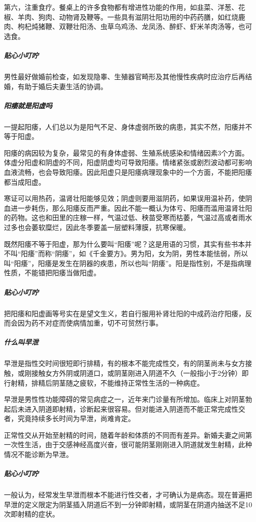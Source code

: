 \begin{enumerate}
第六，注重食疗。餐桌上的许多食物都有增进性功能的作用，如韭菜、洋葱、花椒、羊肉、狗肉、动物肾及鞭等。一些具有滋阴壮阳功用的中药药膳，如红烧鹿肉、枸杞炖猪鞭、双鞭壮阳汤、虫草乌鸡汤、龙凤汤、醉虾、虾米羊肉汤等，也可选食。

\subparagraph{贴心小叮咛}

男性最好做婚前检查，如发现隐睾、生殖器官畸形及其他慢性疾病时应治疗后再结婚，有助于婚后夫妻生活的协调。

\subparagraph{阳痿就是阳虚吗}

一提起阳痿，人们总以为是阳气不足、身体虚弱所致的病患，其实不然，阳痿并不等于阳虚。

阳痿的病因较为复杂，最常见的有身体虚弱、生殖系统感染和情绪因素3个方面。体虚分阳虚和阴虚的不同，阳虚阴虚均可导致阳痿。情绪紧张或剧烈波动都可影响血液流畅，也会导致阳痿。因此阳虚只是阳痿病理现象中的一个方面，不能把阳痿都当成阳虚。

寒证可以用热药，温肾壮阳能够见效；阴虚则要用滋阴药，如果误用温补药，使阴血进一步耗伤，那么阳痿反而严重。因此不能一概认为体亏、阳痿而滥用温肾壮阳的药物。这也和田里的庄稼一样，气温过低、秧苗受寒而枯萎，气温过高或者雨水过多也会萎软糜烂，因此冬季要盖一层塑料薄膜，抗寒保暖。

既然阳痿不等于阳虚，那为什么要叫“阳痿”呢？这是用语的习惯，其实有些书本并不叫“阳痿”而称“阴痿”，如《千金要方》。男为阳，女为阴，男性本能怯弱，所以叫“阳痿”，阳痿是发生在阴器的疾患，所以也叫“阴痿”。阳是指性别，不是指病理性质，不能错把阳痿当做阳虚。

\subparagraph{贴心小叮咛}

把阳痿和阳虚画等号实在是望文生义，若自行服用补肾壮阳的中成药治疗阳痿，反而会因为药不对症而使病情加重，切不可贸然行事。

\subparagraph{什么叫早泄}

早泄是指性交时间很短即行排精，有的根本不能完成性交，有的阴茎尚未与女方接触，或刚接触女方外阴或阴道口，或阴茎刚进入阴道不久（一般指小于2分钟）即行射精，排精后阴茎随之疲软，不能维持正常性生活的一种病症。

早泄是男性性功能障碍的常见病症之一，近年来门诊量有所增加。临床上对阴茎勃起后未进入阴道即射精，诊断起来很容易。但对能进入阴道而不能正常完成性交者，究竟持续多长时间为早泄，尚难肯定。

正常性交从开始至射精的时间，随着年龄和体质的不同而有差异。新婚夫妻之间第一次性生活，由于交感神经高度兴奋，很可能阴茎刚刚进入阴道就发生射精，此种情况不能诊断为早泄。

\subparagraph{贴心小叮咛}

一般认为，经常发生早泄而根本不能进行性交者，才可确认为是病态。现在普遍把早泄的定义限定为阴茎插入阴道后不到一分钟即射精，或阴茎在阴道内抽送不足10次即射精的症状。


\end{enumerate}
